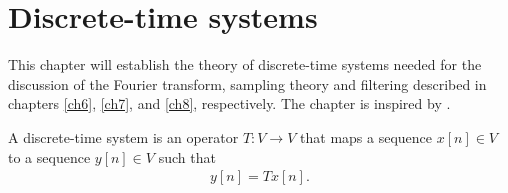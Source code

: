 \chapter{Discrete-time systems}\label{discrete_time_systems} \label{ch4}
This chapter will establish the theory of discrete-time systems needed for the discussion of the Fourier transform, sampling theory and filtering described in chapters \ref{ch6}, \ref{ch7}, and \ref{ch8}, respectively. The chapter is inspired by \cite{pages 195-198, FSP}.
\begin{definition}\label{def:discrete_time_system}
A discrete-time system is an operator $T: V \to V$ that maps a sequence $x[n]\in V$ to a sequence $y[n]\in V$ such that
\begin{align}\label{eq:DTS}
y[n]=Tx[n].
\end{align}
\end{definition}

